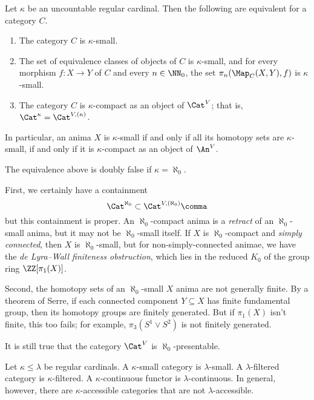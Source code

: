 \begin{eg}
	Let $ \kappa $ be an uncountable regular cardinal.
	Then the following are equivalent for a category $ C $.
	\begin{enumerate}
		\item The category $ C $ is $ \kappa $-small.
		\item The set of equivalence classes
			of objects of $C$ is $ \kappa $-small,
			and for every morphism
			$ f \colon X \to Y $ of $ C $
			and every $ n \in \NN_0$,
			the set $ \pi_n(\Map_C(X,Y),f) $ is
			$ \kappa $-small.
		\item The category $ C $ is $ \kappa $-compact
			as an object of $ \Cat^V $;
			that is, $ \Cat^{\kappa} = \Cat^{V,(\kappa)} $.
	\end{enumerate}
	In particular, an anima $ X $ is $ \kappa $-small if and only if
	all its homotopy sets are $ \kappa $-small, if and only if
	it is $ \kappa $-compact as an object of $ \An^V $.
\end{eg}

\begin{eg}
	The equivalence above is doubly false if $ \kappa = \aleph_0 $.

	First, we certainly have a containment
	\[ \Cat^{\aleph_0} \subset \Cat^{V,(\aleph_0)} \comma \]
	but this containment is proper.
	An $ \aleph_0 $-compact anima is a \emph{retract} of
	an $ \aleph_0 $-small anima, but 
	it may not be $ \aleph_0 $-small itself.
	If $ X $ is $ \aleph_0 $-compact and \emph{simply connected},
	then $ X $ is $ \aleph_0 $-small, but
	for non-simply-connected animae,
	we have the \emph{de Lyra--Wall finiteness obstruction},
	which lies in the reduced $ K_0 $ of the group ring $ \ZZ[\pi_1(X)] $.

	Second, the homotopy sets of an $ \aleph_0 $-small $ X $ anima
	are not generally finite.
	By a theorem of Serre,
	if each connected component $ Y \subseteq X $
	has finite fundamental group, then
	its homotopy groups are finitely generated.
	But if $ \pi_1(X) $ isn't finite,
	this too fails;
	for example, $ \pi_3(S^1 \vee S^2) $ is not finitely generated.

	It is still true that the category $ \Cat^V $ is
	$ \aleph_0 $-presentable.
\end{eg}

\begin{nul}
	Let $ \kappa \leq \lambda $ be regular cardinals.
	A $ \kappa $-small category is $ \lambda $-small.
	A $ \lambda $-filtered category is $ \kappa $-filtered.
	A $ \kappa $-continuous functor is $ \lambda $-continuous.
	In general, however, there are $ \kappa $-accessible categories
	that are not $ \lambda $-accessible.
\end{nul}

